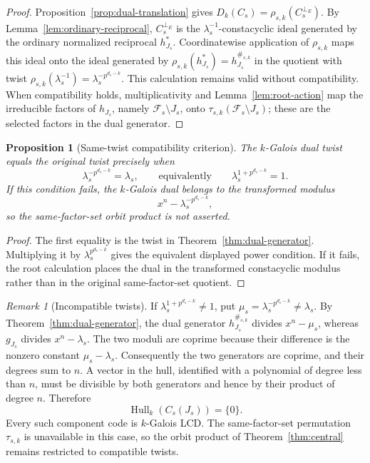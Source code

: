 \documentclass[10pt,a4paper]{article}
\newcommand{\Fs}{\mathcal F_s}
\newcommand{\Hull}{\operatorname{Hull}}
\newcommand{\perpE}{\perp_E}
\newcommand{\Dk}{D_k}
\numberwithin{equation}{section}
\theoremstyle{plain}
\newtheorem{proposition}[theorem]{Proposition}
\theoremstyle{definition}
\theoremstyle{remark}
\newtheorem{remark}[theorem]{Remark}
\begin{document}
\begin{proof}
Proposition~\ref{prop:dual-translation} gives
$\Dk(C_s)=\rho_{s,k}(C_s^{\perpE})$. By
Lemma~\ref{lem:ordinary-reciprocal}, $C_s^{\perpE}$ is the
$\lambda_s^{-1}$-constacyclic ideal generated by the ordinary normalized
reciprocal $h_{J_s}^*$. Coordinatewise application of $\rho_{s,k}$ maps this
ideal onto the ideal generated by
$\rho_{s,k}(h_{J_s}^*)=h_{J_s}^{\#_{s,k}}$ in the quotient with twist
$\rho_{s,k}(\lambda_s^{-1})=\lambda_s^{-p^{d_s-k}}$. This calculation remains
valid without compatibility. When compatibility holds, multiplicativity and
Lemma~\ref{lem:root-action} map the irreducible factors of $h_{J_s}$, namely
$\Fs\setminus J_s$, onto $\tau_{s,k}(\Fs\setminus J_s)$; these are the selected
factors in the dual generator.
\end{proof}

\begin{proposition}[Same-twist compatibility criterion]\label{prop:same-twist}
The $k$-Galois dual twist equals the original twist precisely when
\[
\lambda_s^{-p^{d_s-k}}=\lambda_s,
\qquad\text{equivalently}\qquad
\lambda_s^{1+p^{d_s-k}}=1.
\]
If this condition fails, the $k$-Galois dual belongs to the transformed modulus
\[
x^n-\lambda_s^{-p^{d_s-k}},
\]
so the same-factor-set orbit product is not asserted.
\end{proposition}

\begin{proof}
The first equality is the twist in Theorem~\ref{thm:dual-generator}. Multiplying
it by $\lambda_s^{p^{d_s-k}}$ gives the equivalent displayed power condition. If
it fails, the root calculation places the dual in the transformed constacyclic
modulus rather than in the original same-factor-set quotient.
\end{proof}

\begin{remark}[Incompatible twists]\label{rem:incompatible}
If $\lambda_s^{1+p^{d_s-k}}\neq1$, put $\mu_s=\lambda_s^{-p^{d_s-k}}\ne\lambda_s$.
By Theorem~\ref{thm:dual-generator}, the dual generator $h_{J_s}^{\#_{s,k}}$
divides $x^n-\mu_s$, whereas $g_{J_s}$ divides $x^n-\lambda_s$. The two moduli
are coprime because their difference is the nonzero constant $\mu_s-\lambda_s$.
Consequently the two generators are coprime, and their degrees sum to $n$. A
vector in the hull, identified with a polynomial of degree less than $n$, must
be divisible by both generators and hence by their product of degree $n$.
Therefore
\[
\Hull_k(C_s(J_s))=\{0\}.
\]
Every such component code is $k$-Galois LCD. The same-factor-set permutation
$\tau_{s,k}$ is unavailable in this case, so the orbit product of
Theorem~\ref{thm:central} remains restricted to compatible twists.
\end{remark}
\end{document}
